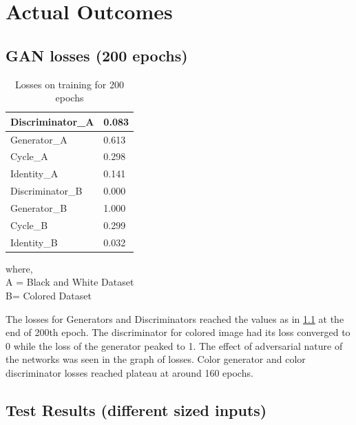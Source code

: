
\chapter{Actual Outcomes}

\setcounter{page}{38}


\section{GAN losses (200 epochs)}

\begin{table}[h]
    \centering
    \begin{tabular}{|l|l|} \hline 
        Discriminator\_A & 0.083 \\ \hline 
        Generator\_A & 0.613 \\ \hline 
        Cycle\_A & 0.298 \\ \hline 
        Identity\_A & 0.141 \\ \hline 
        Discriminator\_B & 0.000 \\ \hline 
        Generator\_B & 1.000 \\ \hline 
        Cycle\_B & 0.299 \\ \hline 
        Identity\_B & 0.032 \\ \hline
        
    \end{tabular}
    
    \caption{Losses on training for 200 epochs}
    \label{table:table_loss}
   
   \noindent where,\\
    A = Black and White Dataset\\
    B= Colored Dataset \\
\end{table}
     
\noindent The losses for Generators and Discriminators reached the values as in \ref{table:table_loss} at the end of 200th epoch. The discriminator for colored image had its loss converged to 0 while the loss of the generator peaked to 1.  The effect of adversarial nature of the networks was seen in the graph of losses. Color generator and color discriminator losses reached plateau at around 160 epochs.

\clearpage
\section{Test Results (different sized inputs)}


